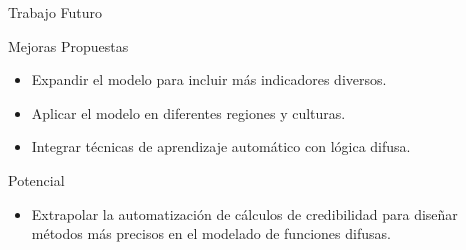 \documentclass{beamer}
\begin{document}
\begin{frame}{Trabajo Futuro}
    \begin{block}{Mejoras Propuestas}
        \begin{itemize}
            \item Expandir el modelo para incluir más indicadores diversos.
            \item Aplicar el modelo en diferentes regiones y culturas.
            \item Integrar técnicas de aprendizaje automático con lógica difusa.
        \end{itemize}
    \end{block}
    \begin{block}{Potencial}
        \begin{itemize}
            \item Extrapolar la automatización de cálculos de credibilidad para diseñar métodos más precisos en el modelado de funciones difusas.
        \end{itemize}
    \end{block}
\end{frame}
\end{document}
